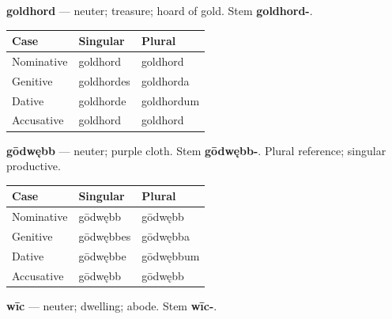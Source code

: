 \textbf{goldhord} — neuter; treasure; hoard of gold. Stem \textbf{goldhord-}.

\par\begingroup
\fontsize{10.5}{13.2}\selectfont
\setlength{\LTleft}{0pt}\setlength{\LTright}{\fill}
\noindent
\begin{tabular}{@{}>{\raggedright\arraybackslash}p{39.46mm}>{\raggedright\arraybackslash}p{39.46mm}>{\raggedright\arraybackslash}p{39.46mm}@{}}
\toprule
\textbf{Case} & \textbf{Singular} & \textbf{Plural} \\
\midrule
Nominative & goldhord & goldhord \\
Genitive & goldhordes & goldhorda \\
Dative & goldhorde & goldhordum \\
Accusative & goldhord & goldhord \\
\bottomrule
\end{tabular}
\par\endgroup

\textbf{gōdwębb} — neuter; purple cloth. Stem \textbf{gōdwębb-}. Plural reference; singular productive.

\par\begingroup
\fontsize{10.5}{13.2}\selectfont
\setlength{\LTleft}{0pt}\setlength{\LTright}{\fill}
\noindent
\begin{tabular}{@{}>{\raggedright\arraybackslash}p{39.46mm}>{\raggedright\arraybackslash}p{39.46mm}>{\raggedright\arraybackslash}p{39.46mm}@{}}
\toprule
\textbf{Case} & \textbf{Singular} & \textbf{Plural} \\
\midrule
Nominative & gōdwębb & gōdwębb \\
Genitive & gōdwębbes & gōdwębba \\
Dative & gōdwębbe & gōdwębbum \\
Accusative & gōdwębb & gōdwębb \\
\bottomrule
\end{tabular}
\par\endgroup

\textbf{wīc} — neuter; dwelling; abode. Stem \textbf{wīc-}.

